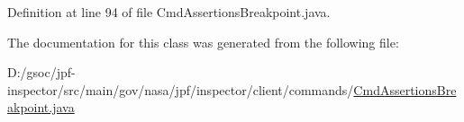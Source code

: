 Definition at line 94 of file Cmd\+Assertions\+Breakpoint.\+java.



The documentation for this class was generated from the following file\+:\begin{DoxyCompactItemize}
\item 
D\+:/gsoc/jpf-\/inspector/src/main/gov/nasa/jpf/inspector/client/commands/\hyperlink{_cmd_assertions_breakpoint_8java}{Cmd\+Assertions\+Breakpoint.\+java}\end{DoxyCompactItemize}
